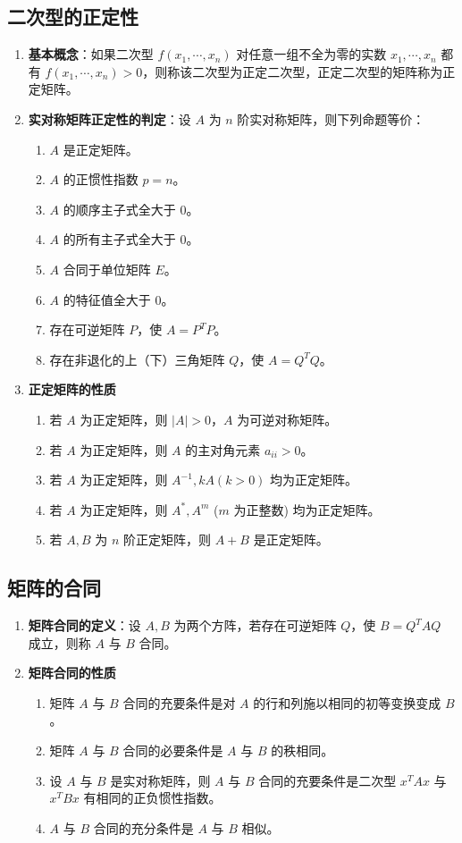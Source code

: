 \documentclass[UTF8]{ctexart}
\theoremstyle{mydef}
\begin{document}
\subsection{二次型的正定性}
\begin{enumerate}
    \item \textbf{基本概念}：如果二次型 $f(x_1, \cdots, x_n)$ 对任意一组不全为零的实数 $x_1, \cdots, x_n$ 都有 $f(x_1, \cdots, x_n) > 0$，则称该二次型为正定二次型，正定二次型的矩阵称为正定矩阵。
    \item \textbf{实对称矩阵正定性的判定}：设 $A$ 为 $n$ 阶实对称矩阵，则下列命题等价：
    \begin{enumerate}
        \item $A$ 是正定矩阵。
        \item $A$ 的正惯性指数 $p=n$。
        \item $A$ 的顺序主子式全大于 0。
        \item $A$ 的所有主子式全大于 0。
        \item $A$ 合同于单位矩阵 $E$。
        \item $A$ 的特征值全大于 0。
        \item 存在可逆矩阵 $P$，使 $A=P^T P$。
        \item 存在非退化的上（下）三角矩阵 $Q$，使 $A=Q^T Q$。
    \end{enumerate}
    \item \textbf{正定矩阵的性质}
    \begin{enumerate}
        \item 若 $A$ 为正定矩阵，则 $|A|>0$，$A$ 为可逆对称矩阵。
        \item 若 $A$ 为正定矩阵，则 $A$ 的主对角元素 $a_{ii} > 0$。
        \item 若 $A$ 为正定矩阵，则 $A^{-1}, kA (k>0)$ 均为正定矩阵。
        \item 若 $A$ 为正定矩阵，则 $A^*, A^m$ ($m$ 为正整数) 均为正定矩阵。
        \item 若 $A, B$ 为 $n$ 阶正定矩阵，则 $A+B$ 是正定矩阵。
    \end{enumerate}
\end{enumerate}

\subsection{矩阵的合同}
\begin{enumerate}
    \item \textbf{矩阵合同的定义}：设 $A, B$ 为两个方阵，若存在可逆矩阵 $Q$，使 $B=Q^T A Q$ 成立，则称 $A$ 与 $B$ 合同。
    \item \textbf{矩阵合同的性质}
    \begin{enumerate}
        \item 矩阵 $A$ 与 $B$ 合同的充要条件是对 $A$ 的行和列施以相同的初等变换变成 $B$。
        \item 矩阵 $A$ 与 $B$ 合同的必要条件是 $A$ 与 $B$ 的秩相同。
        \item 设 $A$ 与 $B$ 是实对称矩阵，则 $A$ 与 $B$ 合同的充要条件是二次型 $x^T A x$ 与 $x^T B x$ 有相同的正负惯性指数。
        \item $A$ 与 $B$ 合同的充分条件是 $A$ 与 $B$ 相似。
    \end{enumerate}
\end{enumerate}
\newpage
\end{document}
